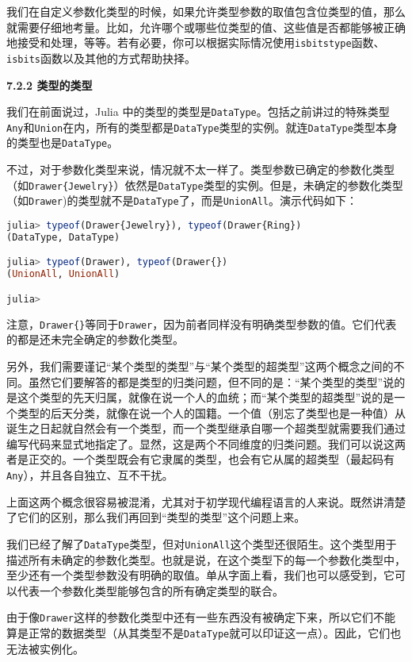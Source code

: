 我们在自定义参数化类型的时候，如果允许类型参数的取值包含位类型的值，那么就需要仔细地考量。比如，允许哪个或哪些位类型的值、这些值是否都能够被正确地接受和处理，等等。若有必要，你可以根据实际情况使用\verb|isbitstype|函数、\verb|isbits|函数以及其他的方式帮助抉择。

\textbf{7.2.2 类型的类型}

我们在前面说过，Julia 中的类型的类型是\verb|DataType|。包括之前讲过的特殊类型\verb|Any|和\verb|Union|在内，所有的类型都是\verb|DataType|类型的实例。就连\verb|DataType|类型本身的类型也是\verb|DataType|。

不过，对于参数化类型来说，情况就不太一样了。类型参数已确定的参数化类型（如\verb|Drawer{Jewelry}|）依然是\verb|DataType|类型的实例。但是，未确定的参数化类型（如\verb|Drawer|)的类型就不是\verb|DataType|了，而是\verb|UnionAll|。演示代码如下：
\begin{lstlisting}[language=julia]
julia> typeof(Drawer{Jewelry}), typeof(Drawer{Ring})
(DataType, DataType)

julia> typeof(Drawer), typeof(Drawer{})
(UnionAll, UnionAll)

julia> 
\end{lstlisting}

注意，\verb|Drawer{}|等同于\verb|Drawer|，因为前者同样没有明确类型参数的值。它们代表的都是还未完全确定的参数化类型。

另外，我们需要谨记“某个类型的类型”与“某个类型的超类型”这两个概念之间的不同。虽然它们要解答的都是类型的归类问题，但不同的是：“某个类型的类型”说的是这个类型的先天归属，就像在说一个人的血统；而“某个类型的超类型”说的是一个类型的后天分类，就像在说一个人的国籍。一个值（别忘了类型也是一种值）从诞生之日起就自然会有一个类型，而一个类型继承自哪一个超类型就需要我们通过编写代码来显式地指定了。显然，这是两个不同维度的归类问题。我们可以说这两者是正交的。一个类型既会有它隶属的类型，也会有它从属的超类型（最起码有\verb|Any|），并且各自独立、互不干扰。

上面这两个概念很容易被混淆，尤其对于初学现代编程语言的人来说。既然讲清楚了它们的区别，那么我们再回到“类型的类型”这个问题上来。

我们已经了解了\verb|DataType|类型，但对\verb|UnionAll|这个类型还很陌生。这个类型用于描述所有未确定的参数化类型。也就是说，在这个类型下的每一个参数化类型中，至少还有一个类型参数没有明确的取值。单从字面上看，我们也可以感受到，它可以代表一个参数化类型能够包含的所有确定类型的联合。

由于像\verb|Drawer|这样的参数化类型中还有一些东西没有被确定下来，所以它们不能算是正常的数据类型（从其类型不是\verb|DataType|就可以印证这一点）。因此，它们也无法被实例化。

